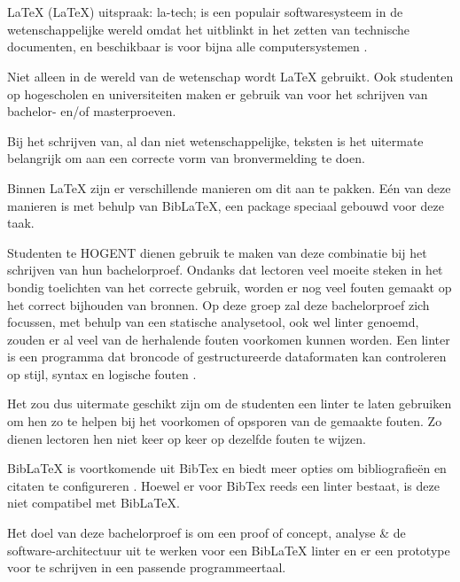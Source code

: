 
\chapter{}%
\label{ch:inleiding}

LaTeX (\LaTeX) uitspraak: la-tech; is een populair softwaresysteem in de wetenschappelijke wereld omdat het uitblinkt in het zetten van technische documenten,
en beschikbaar is voor bijna alle computersystemen \autocite{Oetiker2023}.

Niet alleen in de wereld van de wetenschap wordt LaTeX gebruikt. Ook studenten op hogescholen en universiteiten maken er gebruik van voor het schrijven van bachelor- en/of masterproeven.

Bij het schrijven van, al dan niet wetenschappelijke, teksten is het uitermate belangrijk om aan een correcte vorm van bronvermelding te doen.

Binnen LaTeX zijn er verschillende manieren om dit aan te pakken. Eén van deze manieren is met behulp van BibLaTeX, een package speciaal gebouwd voor deze taak.

Studenten te HOGENT dienen gebruik te maken van deze combinatie bij het schrijven van hun bachelorproef. Ondanks dat lectoren veel moeite steken in het bondig toelichten van het correcte gebruik, worden er nog veel fouten gemaakt op het correct bijhouden van bronnen. 
Op deze groep zal deze bachelorproef zich focussen, met behulp van een statische analysetool, ook wel linter genoemd, zouden er al veel van de herhalende fouten voorkomen kunnen worden. Een linter is een programma dat broncode of gestructureerde dataformaten kan controleren op stijl, syntax en logische fouten \autocite{Kamunya2023}.

Het zou dus uitermate geschikt zijn om de studenten een linter te laten gebruiken om hen zo te helpen bij het voorkomen of opsporen van de gemaakte fouten. Zo dienen lectoren hen niet keer op keer op dezelfde fouten te wijzen.

BibLaTeX is voortkomende uit BibTex en biedt meer opties om bibliografieën en citaten te configureren \autocite{Cassidy2013}. Hoewel er voor BibTex reeds een linter bestaat, is deze niet compatibel met BibLaTeX.

Het doel van deze bachelorproef is om een proof of concept, analyse \& de software-architectuur uit te werken voor een BibLaTeX linter en er een prototype voor te schrijven in een passende programmeertaal. 

